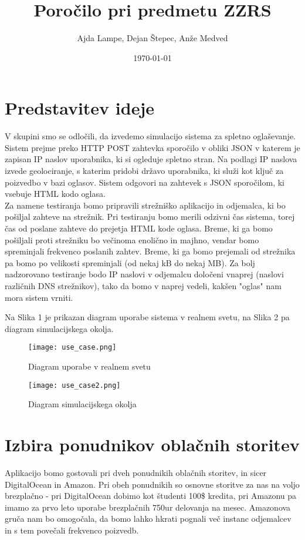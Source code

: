 \documentclass[11pt]{article}
\title{Poročilo pri predmetu ZZRS}
\author{Ajda Lampe, Dejan Štepec, Anže Medved}
\date{\today}
\begin{document}
\maketitle

\section{Predstavitev ideje}
V skupini smo se odločili, da izvedemo simulacijo sistema za spletno oglaševanje. Sistem prejme preko HTTP POST zahtevka sporočilo v obliki JSON v katerem je zapisan IP naslov uporabnika, ki si ogleduje spletno stran. Na podlagi IP naslova izvede geolociranje, s katerim pridobi državo uporabnika, ki služi kot ključ za poizvedbo v bazi oglasov. Sistem odgovori na zahtevek s JSON sporočilom, ki vsebuje HTML kodo oglasa.\\

\noindent
Za namene testiranja bomo pripravili strežniško aplikacijo in odjemalca, ki bo pošiljal zahteve na strežnik. Pri testiranju bomo merili odzivni čas sistema, torej čas od poslane zahteve do prejetja HTML kode oglasa. Breme, ki ga bomo pošiljali proti strežniku bo večinoma enolično in majhno, vendar bomo spreminjali frekvenco poslanih zahtev. Breme, ki ga bomo prejemali od strežnika pa bomo po velikosti spreminjali (od nekaj kB do nekaj MB). Za bolj nadzorovano testiranje bodo IP naslovi v odjemalcu določeni vnaprej (naslovi različnih DNS strežnikov), tako da bomo v naprej vedeli, kakšen "oglas" nam mora sistem vrniti.

Na Slika 1 je prikazan diagram uporabe sistema v realnem svetu, na Slika 2 pa diagram simulacijskega okolja.

\begin{figure}
  \centering
    \texttt{[image: use\_case.png]}
  \caption{Diagram uporabe v realnem svetu}
  \label{fig:use_case}
\end{figure}


\begin{figure}
  \centering
    \texttt{[image: use\_case2.png]}
  \caption{Diagram simulacijskega okolja}
  \label{fig:use_case2}
\end{figure}


\section{Izbira ponudnikov oblačnih storitev}
Aplikacijo bomo gostovali pri dveh ponudnikih oblačnih storitev, in sicer DigitalOcean in Amazon. Pri obeh ponudnikih so osnovne storitve za nas na voljo brezplačno - pri DigitalOcean dobimo kot študenti 100\$ kredita, pri Amazonu pa imamo za prvo leto uporabe brezplačnih 750ur delovanja na mesec. Amazonova gruča nam bo omogočala, da bomo lahko hkrati pognali več instanc odjemalcev in s tem povečali frekvenco poizvedb.
\end{document}
